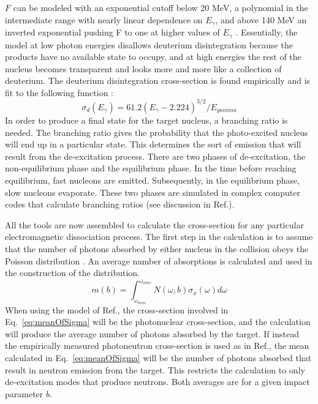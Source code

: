     $F$ can be modeled with an exponential cutoff below 20 MeV, a polynomial in 
      the intermediate range with nearly linear dependence on $E_{\gamma}$, and 
      above 140 MeV an inverted exponential pushing F to one at higher values 
      of $E_{\gamma}$ \cite{emPCite4}.
    Essentially, the model at low photon energies disallows deuterium 
      disintegration because the products have no available state to occupy, 
      and at high energies the rest of the nucleus becomes transparent and 
      looks more and more like a collection of deuterium.
    The deuterium disintegration cross-section is found empirically and is fit 
      to the following function \cite{emPCite4}:
    \begin{equation}
      \sigma_{d}(E_{\gamma})=61.2\left(E_{\gamma}-2.224\right)^{3/2}/E_{gamma}
      \label{eq:deDisSigma}
    \end{equation}
    In order to produce a final state for the target nucleus, a branching ratio
      is needed.
    The branching ratio gives the probability that the photo-excited nucleus 
      will end up in a particular state.
    This determines the sort of emission that will result from the 
      de-excitation process.
    There are two phases of de-excitation, the non-equilibrium phase and the 
      equilibrium phase.
    In the time before reaching equilibrium, fast nucleons are emitted.
    Subsequently, in the equilibrium phase, slow nucleons evaporate.
    These two phases are simulated in complex computer codes that calculate 
      branching ratios (see discussion in Ref.\cite{emPCite4}).

    All the tools are now assembled to calculate the cross-section for any 
      particular electromagnetic dissociation process.
    The first step in the calculation is to assume that the number of photons 
      absorbed by either nucleus in the collision obeys the Poisson 
      distribution \cite{emPCite3,emPCite4}.
    An average number of absorptions is calculated and used in the construction
      of the distribution.
      \begin{equation}
        m(b)=\int^{\omega_{max}}_{\omega_{min}}N(\omega,b)\sigma_{x}(\omega)d\omega
        \label{eq:meanOfSigma}
      \end{equation}
    When using the model of Ref.\cite{emPCite4}, the cross-section involved in Eq.~\ref{eq:meanOfSigma} will 
      be the photonuclear cross-section, and the calculation will produce the 
      average number of photons absorbed by the target.
    If instead the empirically measured photoneutron cross-section is used as 
      in Ref.\cite{emPCite3}, the mean calculated in Eq.~\ref{eq:meanOfSigma} will be the number of photons 
      absorbed that result in neutron emission from the target.
    This restricts the calculation to only de-excitation modes that produce 
      neutrons.
    Both averages are for a given impact parameter $b$.

